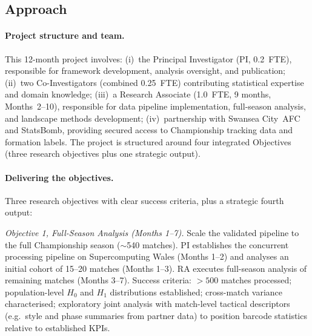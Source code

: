 \subsection{Approach}

\paragraph{Project structure and team.}
This 12-month project involves: (i)~the Principal Investigator (PI, 0.2~FTE), responsible for framework development, analysis oversight, and publication; (ii)~two Co-Investigators (combined 0.25~FTE) contributing statistical expertise and domain knowledge; (iii)~a Research Associate (1.0~FTE, 9 months, Months~2--10), responsible for data pipeline implementation, full-season analysis, and landscape methods development; (iv)~partnership with Swansea City~AFC and StatsBomb, providing secured access to Championship tracking data and formation labels. The project is structured around four integrated Objectives (three research objectives plus one strategic output).

\paragraph{Delivering the objectives.}
Three research objectives with clear success criteria, plus a strategic fourth output:

\textit{Objective 1, Full-Season Analysis (Months 1--7).} Scale the validated pipeline to the full Championship season ($\sim$540 matches). PI establishes the concurrent processing pipeline on Supercomputing Wales (Months 1--2) and analyses an initial cohort of 15--20 matches (Months 1--3). RA executes full-season analysis of remaining matches (Months 3--7). Success criteria: ${>}500$ matches processed; population-level $H_0$ and $H_1$ distributions established; cross-match variance characterised; exploratory joint analysis with match-level tactical descriptors (e.g.\ style and phase summaries from partner data) to position barcode statistics relative to established KPIs.

